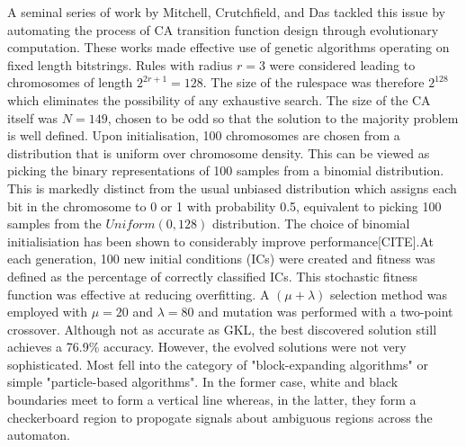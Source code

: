 A seminal series of work by Mitchell, Crutchfield, and Das\cite{mitchell1996evolving} tackled this issue by automating the process of CA transition function design through evolutionary computation. These works made effective use of genetic algorithms operating on fixed length bitstrings. Rules with radius $r = 3$ were considered leading to chromosomes of length $2^{2r+1}=128$. The size of the rulespace was therefore $2^{128}$ which eliminates the possibility of any exhaustive search. The size of the CA itself was $N=149$, chosen to be odd so that the solution to the majority problem is well defined. Upon initialisation, 100 chromosomes are chosen from a distribution that is uniform over chromosome density. This can be viewed as picking the binary representations of 100 samples from a binomial distribution. This is markedly distinct from the usual unbiased distribution which assigns each bit in the chromosome to 0 or 1 with probability 0.5, equivalent to picking 100 samples from the $Uniform(0, 128)$ distribution. The choice of binomial initialisiation has been shown to considerably improve performance[CITE].At each generation, 100 new initial conditions (ICs) were created and fitness was defined as the percentage of correctly classified ICs. This stochastic fitness function was effective at reducing overfitting. A $(\mu+\lambda)$ selection method was employed with $\mu=20$ and $\lambda=80$ and mutation was performed with a two-point crossover. Although not as accurate as GKL, the best discovered solution still achieves a 76.9\% accuracy. However, the evolved solutions were not very sophisticated. Most fell into the category of "block-expanding algorithms" or simple "particle-based algorithms". In the former case, white and black boundaries meet to form a vertical line whereas, in the latter, they form a checkerboard region to propogate signals about ambiguous regions across the automaton.\\

